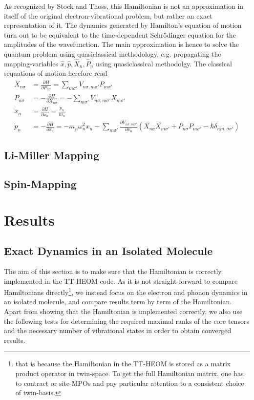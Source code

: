 \documentclass{article}
\begin{document}
As recognized by Stock and Thoss, this Hamiltonian is not an approximation in itself of the original electron-vibrational problem, but rather an exact representation of it. The dynamics generated by Hamilton's equation of motion turn out to be equivalent to the time-dependent Schrödinger equation for the amplitudes of the wavefunction. 
The main approximation is hence to solve the quantum problem using quasiclassical methodology, e.g. propagating the mapping-variables $\hat{x},\hat{p},\hat{X}_n,\hat{P}_n$ using quasiclassical methodolgy. 
The classical sequations of motion herefore read
\begin{align}
	\dot{X}_{n\sigma}& = \frac{\partial H}{\partial P_{n\sigma}}= \sum_{m\sigma'} V_{n\sigma,m\sigma'}P_{m\sigma'}\\
	\dot{P}_{n\sigma}& = -\frac{\partial H}{\partial X_{n\sigma}}= -\sum_{m\sigma'} V_{n\sigma,m\sigma'}X_{m\sigma'}\\
	\dot{x}_n &= \frac{\partial H}{\partial x_n}= \frac{p_n}{m_n}\\
	\dot{p}_n &= -\frac{\partial H}{\partial x_n}= -m_n\omega_n^2 x_n - \sum_{m\sigma'}\frac{\partial V_{n\sigma,m\sigma'}}{\partial x_n }(X_{n\sigma}X_{m\sigma'}+P_{n\sigma}P_{m\sigma'}-\hbar\delta_{nm,\sigma\sigma'})
\end{align}
\subsection{Li-Miller Mapping}
\subsection{Spin-Mapping}
\section{Results}
\subsection{Exact Dynamics in an Isolated Molecule}
The aim of this section is to make sure that the Hamiltonian is correctly implemented in the TT-HEOM code. As it is not straight-forward to compare Hamiltonians directly\footnote{that is because the Hamiltonian in the TT-HEOM is stored as a matrix product operator in twin-space. To get the full Hamiltonian matrix, one has to contract or site-MPOs and pay particular attention to a consistent choice of twin-basis.}, we instead focus on the electron and phonon dynamics in an isolated molecule, and compare results term by term of the Hamiltonian. 
Apart from showing that the Hamiltonian is implemented correctly, we also use the following tests for determining the required maximal ranks of the core tensors and the necessary number of vibrational states in order to obtain converged results. 
\end{document}
